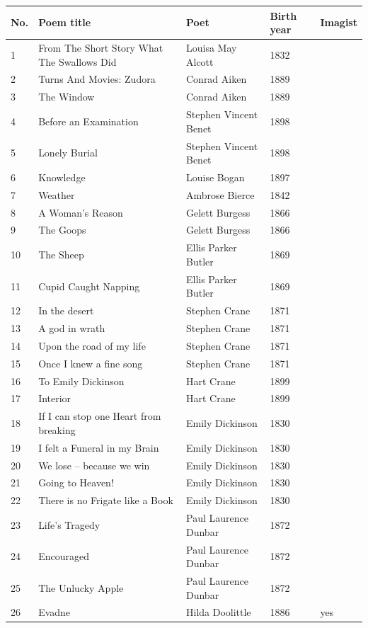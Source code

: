 \documentclass{book}
\begin{document}
\begin{table}[h!]
\tiny
\begin{tabular}{lllll}
\toprule
No. & Poem title & Poet & Birth year & Imagist \\
\midrule
1 & From The Short Story What The Swallows Did & Louisa May Alcott & 1832 \\
2 & Turns And Movies: Zudora & Conrad Aiken & 1889 \\
3 & The Window & Conrad Aiken & 1889 \\
4 & Before an Examination & Stephen Vincent Benet & 1898 \\
5 & Lonely Burial & Stephen Vincent Benet & 1898 \\
6 & Knowledge & Louise Bogan & 1897 \\
7 & Weather & Ambrose Bierce & 1842 \\
8 & A Woman's Reason & Gelett Burgess & 1866 \\
9 & The Goops & Gelett Burgess & 1866 \\
10 & The Sheep & Ellis Parker Butler & 1869 \\
11 & Cupid Caught Napping & Ellis Parker Butler & 1869 \\
12 & In the desert & Stephen Crane & 1871 \\
13 & A god in wrath & Stephen Crane & 1871 \\
14 & Upon the road of my life & Stephen Crane & 1871 \\
15 & Once I knew a fine song & Stephen Crane & 1871 \\
16 & To Emily Dickinson & Hart Crane & 1899 \\
17 & Interior & Hart Crane & 1899 \\
18 & If I can stop one Heart from breaking & Emily Dickinson & 1830 \\
19 & I felt a Funeral in my Brain & Emily Dickinson & 1830 \\
20 & We lose -- because we win & Emily Dickinson & 1830 \\
21 & Going to Heaven! & Emily Dickinson & 1830 \\
22 & There is no Frigate like a Book & Emily Dickinson & 1830 \\
23 & Life's Tragedy & Paul Laurence Dunbar & 1872 \\
24 & Encouraged & Paul Laurence Dunbar & 1872 \\
25 & The Unlucky Apple & Paul Laurence Dunbar & 1872 \\
26 & Evadne & Hilda Doolittle & 1886 & yes \\

\end{tabular}
\end{table}
\end{document}
